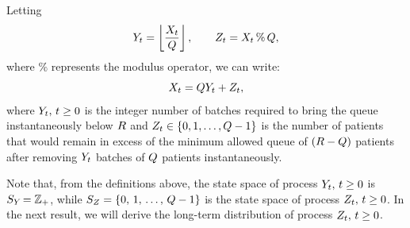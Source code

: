 Letting 
%
\begin{equation} \label{eq:defYZ}
Y_{t} = \left \lfloor \dfrac{X_{t}}{Q} \right \rfloor, \qquad Z_t = X_{t} \, \% \,  Q,
\end{equation}
%
where $\%$ represents the modulus operator, we can write:
%
\[
X_{t} = Q Y_{t} + Z_{t},
\]
% 
where $Y_{t}, \, t \ge 0$ is the integer number of batches required to bring the queue instantaneously below $R$ and $Z_{t} \in \{0, 1, \ldots, Q-1\}$ is the number of patients that would remain in excess of the minimum allowed queue of $(R-Q)$ patients after removing $Y_{t}$ batches of $Q$ patients instantaneously.

Note that, from the definitions above, the state space of process $Y_{t}, \, t \ge 0$ is $S_{Y_{}} = \mathbb Z_+$, while $S_{Z_{}} = \{0, \, 1, \, \ldots, \, Q-1\}$ is the state space of process $Z_{t}, \, t \ge 0$. In the next result, we will derive the long-term distribution of process $Z_{t}, \, t \ge 0$.

